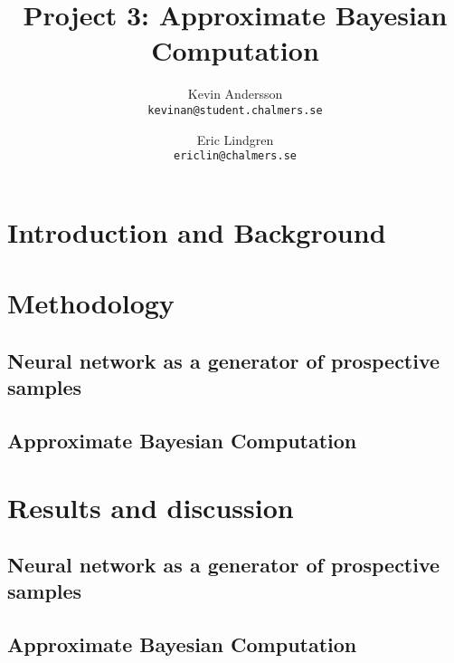 \documentclass[11pt,a4paper]{article}
\title{Project 3: Approximate Bayesian Computation}
\author{
  Kevin Andersson\\
  \texttt{kevinan@student.chalmers.se}
  \and
   Eric Lindgren\\
  \texttt{ericlin@chalmers.se}
}
\begin{document}
\maketitle

{}%
\setcounter{page}{1}
\section{Introduction and Background}



\section{Methodology}


\subsection[Task 1]{Neural network as a generator of prospective samples}
\label{sec:method_NN}


\subsection[Task 4]{Approximate Bayesian Computation}
\label{sec:method_ABC}

\section{Results and discussion}

\subsection[Task 1]{Neural network as a generator of prospective samples}
\label{sec:result_NN}


\subsection[Task 4]{Approximate Bayesian Computation}
\label{sec:result__ABC}


\printbibliography
\end{document}
